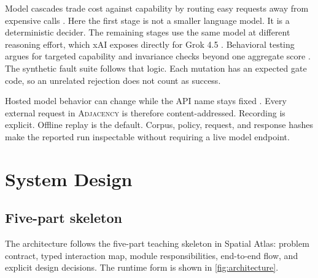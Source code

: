 \documentclass{article}
\newcommand{\Adj}{\textsc{Adjacency}\xspace}
\begin{document}
 Model cascades trade cost against capability by routing
easy requests away from expensive calls \citep{chen2023frugalgpt}. Here the first stage is not a
smaller language model. It is a deterministic decider. The remaining stages use the same model at
different reasoning effort, which xAI exposes directly for Grok 4.5
\citep{xai2026grok45,xai2026reasoning}. Behavioral testing argues for targeted capability and
invariance checks beyond one aggregate score \citep{ribeiro2020checklist}. The synthetic fault suite
follows that logic. Each mutation has an expected gate code, so an unrelated rejection does not
count as success.

 Hosted model behavior can change while the API name stays fixed
\citep{chen2023behavior}. Every external request in \Adj is therefore content-addressed. Recording is
explicit. Offline replay is the default. Corpus, policy, request, and response hashes make the
reported run inspectable without requiring a live model endpoint.

\section{System Design}
\label{sec:method}

\subsection{Five-part skeleton}

The architecture follows the five-part teaching skeleton in Spatial Atlas: problem contract, typed
interaction map, module responsibilities, end-to-end flow, and explicit design decisions. The
runtime form is shown in \cref{fig:architecture}.
\end{document}
